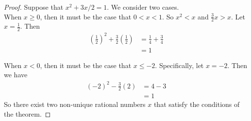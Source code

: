 \documentclass[12pt]{scrartcl} %
\begin{document}
\begin{proof}
Suppose that $x^2 + 3x/2 = 1$. We consider two cases. \\When $x \geq 0$, then it must be the case that $0 < x < 1$. So $x^2 < x$ and $\frac{3}{2}x > x$. Let $x = \frac{1}{2}$. Then \begin{align}
(\frac{1}{2})^2 + \frac{3}{2}(\frac{1}{2}) &= \frac{1}{4} + \frac{3}{4}\\
&= 1
\end{align}

When $x < 0$, then it must be the case that $x \leq -2$. Specifically, let $x = -2$. Then we have
\begin{align}
(-2)^2 - \frac{3}{2}(2) &= 4 - 3\\
&= 1
\end{align}
So there exist two non-unique rational numbers $x$ that satisfy the conditions of the theorem.
\end{proof}
\end{document}
